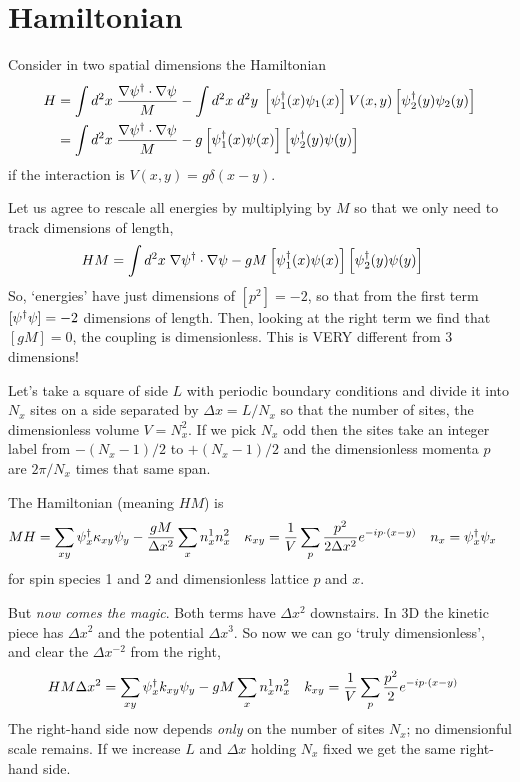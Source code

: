 \section{Hamiltonian}\label{sec:hamiltonian}

Consider in two spatial dimensions the Hamiltonian
\begin{align}
	H
	&= \int d^2x\; \frac{\nabla \psi{}^{\dagger} \cdot \nabla \psi}{M} - \int d^2x\; d^2y\; \left[\psi{}^{\dagger}_1(x) \psi_1(x)\right] V(x,y) \left[\psi{}^{\dagger}_2(y) \psi_2(y)\right]
	\\
	&= \int d^2x\; \frac{\nabla \psi{}^{\dagger} \cdot \nabla \psi}{M} - g \left[\psi{}^{\dagger}_1(x) \psi(x)\right] \left[\psi{}^{\dagger}_2(y) \psi(y)\right]
\end{align}
if the interaction is $V(x,y) = g \delta(x-y)$.

Let us agree to rescale all energies by multiplying by $M$ so that we only need to track dimensions of length,
\begin{align}
	HM
	&= \int d^2x\; \nabla \psi{}^{\dagger} \cdot \nabla \psi - gM \left[\psi{}^{\dagger}_1(x) \psi(x)\right] \left[\psi{}^{\dagger}_2(y) \psi(y)\right]
\end{align}
So, `energies' have just dimensions of $[p^2] = -2$, so that from the first term $[\psi{}^{\dagger}\psi] = -2$ dimensions of length.
Then, looking at the right term we find that $[gM] = 0$, the coupling is dimensionless.
This is VERY different from 3 dimensions!

Let's take a square of side $L$ with periodic boundary conditions and divide it into $N_x$ sites on a side separated by $\Delta x = L/N_x$ so that the number of sites, the dimensionless volume $V=N_x^2$.
If we pick $N_x$ odd then the sites take an integer label from $-(N_x-1)/2$ to $+(N_x-1)/2$ and the dimensionless momenta $p$ are $2\pi / N_x$ times that same span.

The Hamiltonian (meaning $HM$) is
\begin{align}
	MH &= \sum_{xy} \psi{}^{\dagger}_x \kappa_{xy} \psi_y - \frac{gM}{\Delta x^2} \sum_{x} n^1_x n^2_x
	&
	\kappa_{xy} &= \frac{1}{V} \sum_{p} \frac{p^2}{2\Delta x^2} e^{-i p \cdot (x-y)}
	&
	n_x &= \psi{}^{\dagger}_x \psi_x
\end{align}
for spin species 1 and 2 and dimensionless lattice $p$ and $x$.

But \emph{now comes the magic}.
Both terms have $\Delta x^2$ downstairs.
In 3D the kinetic piece has $\Delta x^2$ and the potential $\Delta x^3$.
So now we can go `truly dimensionless', and clear the $\Delta x^{-2}$ from the right,
\begin{align}
	HM \Delta x^2
	&=
	\sum_{xy} \psi{}^{\dagger}_x k_{xy} \psi_y - gM \sum_x n^1_x n^2_x
	&
	k_{xy} &= \frac{1}{V} \sum_{p} \frac{p^2}{2} e^{-i p \cdot (x-y)}
	\label{eq:hamiltonian}
\end{align}
The right-hand side now depends \emph{only} on the number of sites $N_x$; no dimensionful scale remains.
If we increase $L$ and $\Delta x$ holding $N_x$ fixed we get the same right-hand side.

